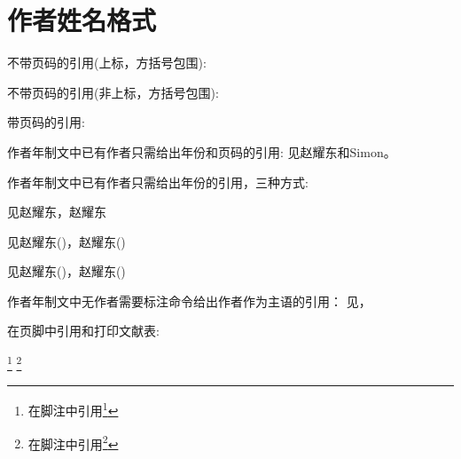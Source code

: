 \documentclass[twoside]{article}
\begin{document}
    \section{作者姓名格式}

 不带页码的引用(上标，方括号包围):
 \cite{FOURNEY1971-17-38}\cite{wang2006another}

 不带页码的引用(非上标，方括号包围):
 \parencite{FOURNEY1971-17-38}\parencite{wang2006another}

 带页码的引用:
 \cite[见][49页]{FOURNEY1971-17-38} \parencite[见][49页]{wang2006another}


作者年制文中已有作者只需给出年份和页码的引用:
见赵耀东和Simon。

作者年制文中已有作者只需给出年份的引用，三种方式:

见赵耀东，赵耀东

见赵耀东(\cite*{FOURNEY1971-17-38})，赵耀东(\cite*{wang2006another})

见赵耀东(\citeyear{FOURNEY1971-17-38})，赵耀东(\citeyear{wang2006another})

作者年制文中无作者需要标注命令给出作者作为主语的引用：
见\textcite{FOURNEY1971-17-38}，\textcite{wang2006another}

在页脚中引用和打印文献表:

 \footnote{在脚注中引用\footcite{FOURNEY1971-17-38}} 
 \footnote{在脚注中引用\footcite{wang2006another}} 

 \nocite{*}

    \printbibliography[category=kindsofnameformats,title=五种不同的姓名格式]

    \printbibliography[notcategory=kindsofnameformats,title=某种期刊的姓名格式]

    
\end{document}
